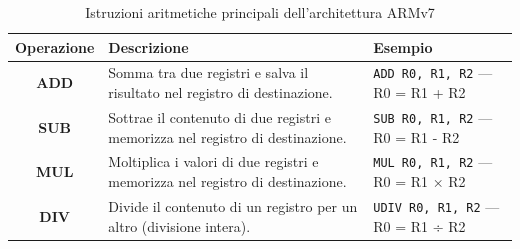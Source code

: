 \documentclass[8pt]{article}
\begin{document}
\begin{table}[h!]
\centering
\caption{Istruzioni aritmetiche principali dell’architettura ARMv7}
\setlength{\tabcolsep}{10pt}
\renewcommand{\arraystretch}{1.3}
\begin{tabular}{|c|p{6cm}|p{5cm}|}
\hline
\textbf{Operazione} & \textbf{Descrizione} & \textbf{Esempio} \\ \hline

\textbf{ADD} &
Somma tra due registri e salva il risultato nel registro di destinazione. &
\texttt{ADD R0, R1, R2} — R0 = R1 + R2 \\ \hline

\textbf{SUB} &
Sottrae il contenuto di due registri e memorizza nel registro di destinazione. &
\texttt{SUB R0, R1, R2} — R0 = R1 - R2 \\ \hline

\textbf{MUL} &
Moltiplica i valori di due registri e memorizza nel registro di destinazione. &
\texttt{MUL R0, R1, R2} — R0 = R1 × R2 \\ \hline

\textbf{DIV} &
Divide il contenuto di un registro per un altro (divisione intera). &
\texttt{UDIV R0, R1, R2} — R0 = R1 ÷ R2 \\ \hline

\end{tabular}
\end{table}
\end{document}
